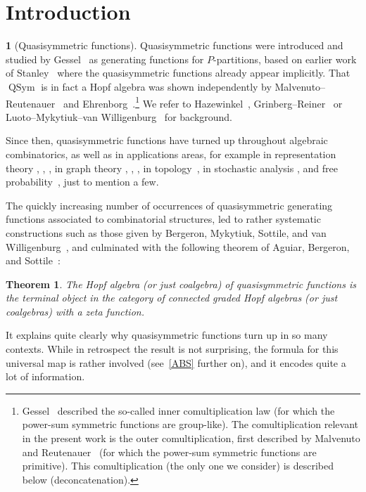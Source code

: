 \documentclass{amsart}
\newcommand{\QSym}{\operatorname{QSym}}
\newtheorem*{untheorem}{Theorem} %
\theoremstyle{definition}
\theoremstyle{noname}
\newtheorem{blanko}[theorem]{}
\begin{document}
\section{Introduction}

\begin{blanko}[Quasisymmetric functions]
  Quasisymmetric functions were introduced and studied by
Gessel~\cite{Gessel:84} as generating functions for $P$-partitions,
based on earlier work of Stanley~\cite{Stanley:1972} where the quasisymmetric
functions already appear implicitly. That $\QSym$ is in fact a Hopf algebra was
shown independently by Malvenuto--Reutenauer~\cite{Malvenuto-Reutenauer} and
Ehrenborg~\cite{Ehrenborg}.\footnote{Gessel~\cite{Gessel:84} described the so-called
inner comultiplication law (for which the power-sum symmetric functions are
group-like). The comultiplication relevant in the present work is the outer
comultiplication, first described by Malvenuto and
Reutenauer~\cite{Malvenuto-Reutenauer} (for which the power-sum symmetric
functions are primitive). This comultiplication (the only one we consider) is
described below (deconcatenation).} We refer to Hazewinkel~\cite{Hazewinkel:2003},
Grinberg--Reiner~\cite{Grinberg-Reiner:1409.8356} or 
Luoto--Mykytiuk--van Willigenburg~\cite{Luoto-Mykytiuk-vanWilligenburg}
for background.

Since then, quasisymmetric functions have turned up throughout algebraic combinatorics, as well
as in applications areas, for example in representation theory
\cite{Hoffman:9907173}, \cite{Krob-Thibon:NSym-IV},
\cite{Billera-Brenti:0710.3965}, in graph theory
\cite{Shareshian-Wachs:1405.4629}, \cite{Alexandersson-Sulzgruber:1807.02460},
\cite{Mason:1810.07148}, in topology~\cite{Baker-Richter:0605743}, in
stochastic analysis \cite{Diehl-EbrahimiFard-Tapia:1906.05823}, and free
probability~\cite{Mastnak-Nica:TAMS2010}, just to mention a few.

The quickly increasing number of occurrences of quasisymmetric generating
functions associated to combinatorial structures, led to rather systematic
constructions such as those given by Bergeron, Mykytiuk, Sottile, and van
Willigenburg~\cite{Bergeron-Mykytiuk-Sottile-vanWilligenburg}, and culminated with
the
following theorem of Aguiar, Bergeron, and 
Sottile~\cite{Aguiar-Bergeron-Sottile}:

\begin{untheorem}
The Hopf algebra (or just coalgebra) of quasisymmetric functions is the terminal
object in the category of connected graded Hopf algebras (or just coalgebras) 
with a zeta function.
\end{untheorem}


It explains quite clearly why quasisymmetric functions turn up in so many contexts.
While in retrospect the result is not surprising, the formula for this universal map
is rather involved (see~\ref{ABS} further on), and it encodes quite a lot
of information.
\end{blanko}
\end{document}
